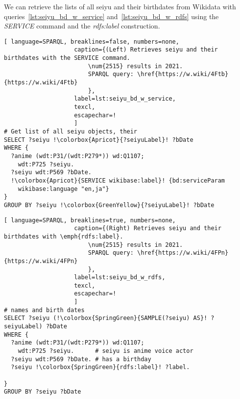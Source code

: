 We can retrieve the lists of all seiyu and their birthdates from Wikidata with queries~\ref{lst:seiyu_bd_w_service} and~\ref{lst:seiyu_bd_w_rdfs} using the \emph{SERVICE} command and the \emph{rdfs:label} construction.

\begin{widepar}%
%
\noindent\begin{minipage}[]{.43\linewidth}
    \captionsetup[lstlisting]{format=llapwide11lines}%
\begin{lstlisting}[ language=SPARQL, breaklines=false, numbers=none,
                    caption={(Left) Retrieves seiyu and their birthdates with the SERVICE command.
                        \num{2515} results in 2021.
                        SPARQL query: \href{https://w.wiki/4Ftb}{https://w.wiki/4Ftb}
                        },
                    label=lst:seiyu_bd_w_service,
                    texcl,
                    escapechar=!
                    ]
# Get list of all seiyu objects, their 
SELECT ?seiyu !\colorbox{Apricot}{?seiyuLabel}! ?bDate
WHERE {
  ?anime (wdt:P31/(wdt:P279*)) wd:Q1107;
    wdt:P725 ?seiyu.       
  ?seiyu wdt:P569 ?bDate. 
  !\colorbox{Apricot}{SERVICE wikibase:label}! {bd:serviceParam 
    wikibase:language "en,ja"}
}
GROUP BY ?seiyu !\colorbox{GreenYellow}{?seiyuLabel}! ?bDate
\end{lstlisting}%
\end{minipage}%
\hfill
\begin{minipage}[]{.55\linewidth}
    \captionsetup[lstlisting]{format=llapwide15lines}%
\begin{lstlisting}[ language=SPARQL, breaklines=true, numbers=none,
                    caption={(Right) Retrieves seiyu and their birthdates with \emph{rdfs:label}.
                        \num{2515} results in 2021.
                        SPARQL query: \href{https://w.wiki/4FPn}{https://w.wiki/4FPn}
                        },
                    label=lst:seiyu_bd_w_rdfs,
                    texcl,
                    escapechar=!
                    ]
# names and birth dates
SELECT ?seiyu (!\colorbox{SpringGreen}{SAMPLE(?seiyu) AS}! ?seiyuLabel) ?bDate
WHERE {
  ?anime (wdt:P31/(wdt:P279*)) wd:Q1107;
    wdt:P725 ?seiyu.      # seiyu is anime voice actor
  ?seiyu wdt:P569 ?bDate. # has a birthday 
  ?seiyu !\colorbox{SpringGreen}{rdfs:label}! ?label.

}
GROUP BY ?seiyu ?bDate
\end{lstlisting}%
\end{minipage}
\end{widepar}%

